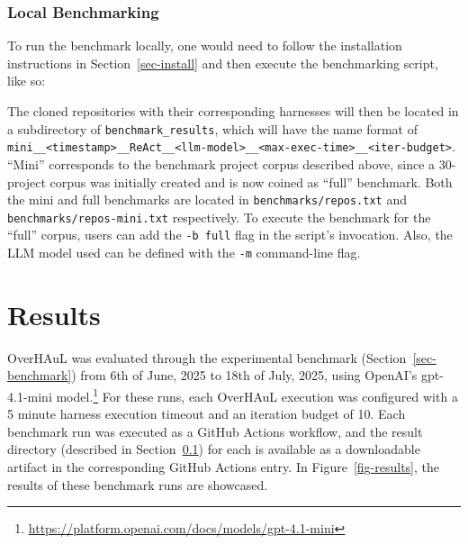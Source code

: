 \documentclass[
  a4paper,
  DIV=11,
  numbers=noendperiod]{scrreprt}
\newenvironment{Shaded}{\begin{snugshade}}{\end{snugshade}}
\newcommand{\NormalTok}[1]{\textcolor[rgb]{0.33,0.33,0.33}{#1}}
\theoremstyle{definition}
\theoremstyle{remark}
\begin{document}
\subsection{Local Benchmarking}\label{sec-local}

To run the benchmark locally, one would need to follow the installation
instructions in Section~\ref{sec-install} and then execute the
benchmarking script, like so:

\begin{Shaded}
\end{Shaded}

The cloned repositories with their corresponding harnesses will then be
located in a subdirectory of \texttt{benchmark\_results}, which will
have the name format of
\texttt{mini\_\_\textless{}timestamp\textgreater{}\_\_ReAct\_\_\textless{}llm-model\textgreater{}\_\_\textless{}max-exec-time\textgreater{}\_\_\textless{}iter-budget\textgreater{}}.
``Mini'' corresponds to the benchmark project corpus described above,
since a 30-project corpus was initially created and is now coined as
``full'' benchmark. Both the mini and full benchmarks are located in
\texttt{benchmarks/repos.txt} and \texttt{benchmarks/repos-mini.txt}
respectively. To execute the benchmark for the ``full'' corpus, users
can add the \texttt{-b\ full} flag in the script's invocation. Also, the
LLM model used can be defined with the \texttt{-m} command-line flag.


\chapter{Results}\label{results}

OverHAuL was evaluated through the experimental benchmark
(Section~\ref{sec-benchmark}) from 6th of June, 2025 to 18th of July,
2025, using OpenAI's gpt-4.1-mini model.\footnote{\url{https://platform.openai.com/docs/models/gpt-4.1-mini}}
For these runs, each OverHAuL execution was configured with a 5 minute
harness execution timeout and an iteration budget of 10. Each benchmark
run was executed as a GitHub Actions workflow, and the result directory
(described in Section~\ref{sec-local}) for each is available as a
downloadable artifact in the corresponding GitHub Actions entry. In
Figure~\ref{fig-results}, the results of these benchmark runs are
showcased.
\end{document}

